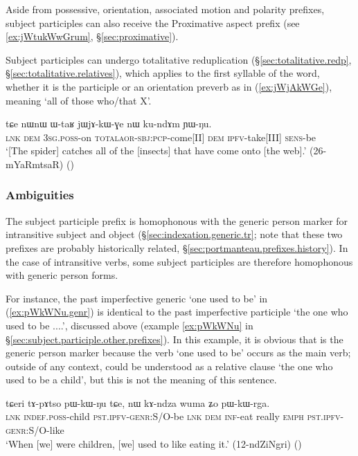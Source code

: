 Aside from possessive, orientation, associated motion and polarity prefixes, subject participles can also receive the Proximative aspect prefix   (see \ref{ex:jWtukWwGrum}, §\ref{sec:proximative}).
 
Subject participles can undergo totalitative reduplication (§\ref{sec:totalitative.redp}, §\ref{sec:totalitative.relatives}), which applies to the first syllable of the word, whether it is the participle  or an orientation preverb as in (\ref{ex:jWjAkWGe}), meaning `all of those who/that X'.

\begin{exe}
\ex \label{ex:jWjAkWGe}
\gll tɕe nɯnɯ ɯ-taʁ jɯ\redp{}jɤ-kɯ-ɣe nɯ ku-ndɤm ɲɯ-ŋu. \\
\textsc{lnk} \textsc{dem} \textsc{3sg}.\textsc{poss}-on \textsc{total}\redp{}\textsc{aor}-\textsc{sbj}:\textsc{pcp}-come[II] \textsc{dem} \textsc{ipfv}-take[III] \textsc{sens}-be \\
\glt `[The spider] catches all of the [insects] that have come onto [the web].' (26-mYaRmtsaR) ()
\end{exe}

\subsubsection{Ambiguities}  \label{sec:subject.participle.ambiguities}
The subject participle  prefix is homophonous with the generic person marker for intransitive subject and object (§\ref{sec:indexation.generic.tr}; note that these two prefixes are probably historically related, §\ref{sec:portmanteau.prefixes.history}). In the case of intransitive verbs, some subject participles are therefore homophonous with generic person forms. 

For instance, the past imperfective generic  `one used to be' in (\ref{ex:pWkWNu.genr}) is identical to the past imperfective participle  `the one who used to be ....', discussed above (example \ref{ex:pWkWNu} in §\ref{sec:subject.participle.other.prefixes}). In this example, it is obvious that  is the generic person marker because the verb  `one used to be' occurs as the main verb; outside of any context,   could be understood as a relative clause `the one who used to be a child', but this is not the meaning of this sentence. 

\begin{exe}
\ex \label{ex:pWkWNu.genr}
 \gll tɕeri tɤ-pɤtso pɯ-kɯ-ŋu tɕe, nɯ kɤ-ndza wuma ʑo pɯ-kɯ-rga. \\
 \textsc{lnk} \textsc{indef}.\textsc{poss}-child \textsc{pst}.\textsc{ipfv}-\textsc{genr}:S/O-be \textsc{lnk} \textsc{dem} \textsc{inf}-eat really \textsc{emph} \textsc{pst}.\textsc{ipfv}-\textsc{genr}:S/O-like \\
 \glt `When [we] were children, [we] used to like eating it.' (12-ndZiNgri) ()
\end{exe}

